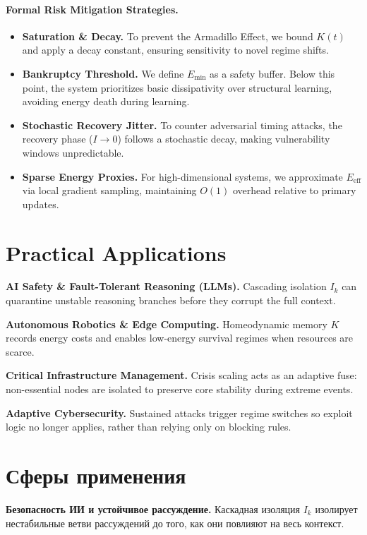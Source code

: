 ﻿\documentclass[12pt,a4paper]{article}
\begin{document}
\paragraph{Formal Risk Mitigation Strategies.}
\begin{itemize}
    \item \textbf{Saturation \& Decay.} To prevent the Armadillo Effect, we bound $K(t)$ and apply a decay constant, ensuring sensitivity to novel regime shifts.
    \item \textbf{Bankruptcy Threshold.} We define $E_{\mathrm{min}}$ as a safety buffer. Below this point, the system prioritizes basic dissipativity over structural learning, avoiding energy death during learning.
    \item \textbf{Stochastic Recovery Jitter.} To counter adversarial timing attacks, the recovery phase ($I\to 0$) follows a stochastic decay, making vulnerability windows unpredictable.
    \item \textbf{Sparse Energy Proxies.} For high-dimensional systems, we approximate $E_{\mathrm{eff}}$ via local gradient sampling, maintaining $O(1)$ overhead relative to primary updates.
\end{itemize}

\section*{Practical Applications}
\textbf{AI Safety \& Fault-Tolerant Reasoning (LLMs).} Cascading isolation $I_k$ can quarantine unstable reasoning branches before they corrupt the full context.

\textbf{Autonomous Robotics \& Edge Computing.} Homeodynamic memory $K$ records energy costs and enables low-energy survival regimes when resources are scarce.

\textbf{Critical Infrastructure Management.} Crisis scaling acts as an adaptive fuse: non-essential nodes are isolated to preserve core stability during extreme events.

\textbf{Adaptive Cybersecurity.} Sustained attacks trigger regime switches so exploit logic no longer applies, rather than relying only on blocking rules.

\section*{Сферы применения}
\textbf{Безопасность ИИ и устойчивое рассуждение.} Каскадная изоляция $I_k$ изолирует нестабильные ветви рассуждений до того, как они повлияют на весь контекст.
\end{document}
